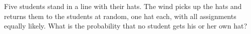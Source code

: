 Five students stand in a line with their hats. The wind picks up the hats and returns them to the students at random, one hat each, with all assignments equally likely. What is the probability that no student gets his or her own hat?
